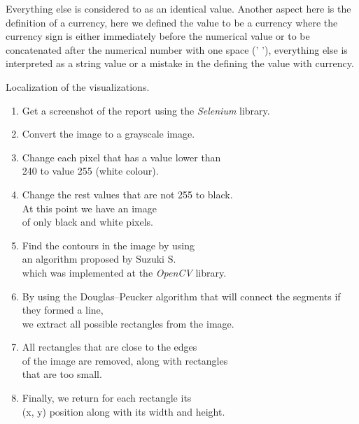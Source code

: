\documentclass[fleqn,moreauthors,10pt]{ds_report}
\begin{document}
Everything else is considered to as an identical value. Another aspect here is the definition of a currency, here we defined the value to be a currency where the currency sign is either immediately before the numerical value or to be concatenated after the numerical number with one space (' '), everything else is interpreted as a string value or a mistake in the defining the value with currency.
\begin{algorithm}

\caption{\hypertarget{algo1}{Localization of the visualizations.}}
\begin{enumerate}
\item Get a screenshot of the report using the \textit{Selenium} library.
\item Convert the image to a grayscale image.
\item Change each pixel that has a value lower than \\ 240 to value 255 (white colour).
\item Change the rest values that are not 255 to black.\\ At this point we have an image \\of only black and white pixels.
\item Find the contours in the image by using \\an algorithm proposed by Suzuki S. \cite{SUZUKI198532} \\which was implemented at the \textit{OpenCV} \cite{opencv_library} library.
\item By using the Douglas–Peucker algorithm that will connect the segments if they formed a line, \\we extract all possible rectangles from the image.
\item All rectangles that are close to the edges \\of the image are removed, along with rectangles \\that are too small.
    \item  Finally, we return for each rectangle its \\ (x, y) position along with its width and height.
\end{enumerate}

\end{algorithm}
\end{document}
